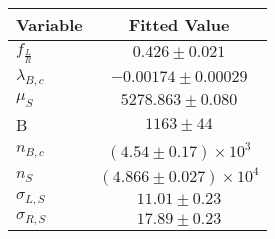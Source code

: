 \begin{tabular}[t]{lc}
\hline
Variable &Fitted Value\\
\hline\hline
$f_{\frac{L}{R}}$&$0.426\pm0.021$\\
\hline
$\lambda_{B,c}$&$-0.00174\pm0.00029$\\
\hline
$\mu_S$&$5278.863\pm0.080$\\
\hline
B&$1163\pm44$\\
\hline
$n_{B,c}$&$(4.54\pm0.17)\times 10^3$\\
\hline
$n_S$&$(4.866\pm0.027)\times 10^4$\\
\hline
$\sigma_{L, S}$&$11.01\pm0.23$\\
\hline
$\sigma_{R, S}$&$17.89\pm0.23$\\
\hline
\end{tabular}